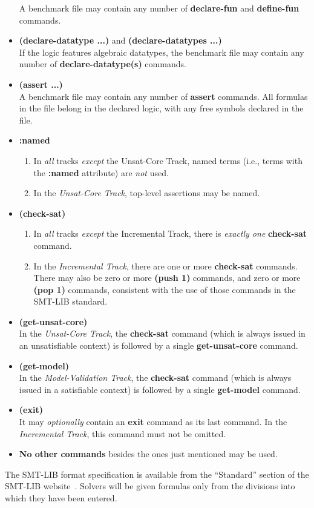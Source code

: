 \documentclass[12pt]{article}
\newcommand{\akey}[1]{\textbf{#1}\xspace}
\newcommand{\bkey}[1]{\textbf{{#1}}\xspace}
\newcommand{\inctrack}{Incremental Track\xspace}
\newcommand{\ucoretrack}{Unsat-Core Track\xspace}
\newcommand{\mvaltrack}{Model-Validation Track\xspace}
\begin{document}
\begin{itemize}
    A benchmark file may contain any number of \akey{declare-fun} and
    \akey{define-fun} commands.
  \item \bkey{(declare-datatype ...)} and \bkey{(declare-datatypes ...)}\\
    If the logic features algebraic datatypes, the benchmark file may
    contain any number of \akey{declare-datatype(s)} commands.
  \item \bkey{(assert ...)}\\
    A benchmark file may contain any number of \akey{assert} commands.  All
    formulas in the file belong in the declared logic, with any free symbols
    declared in the file.
  \item
    \bkey{:named}
    \begin{enumerate}[label=(\alph*)]
      \vspace{-1ex}
      \item In \emph{all} tracks \emph{except} the \ucoretrack,  named
        terms (i.e., terms with the \akey{:named} attribute) are \emph{not}
        used.
      \item In the \emph{\ucoretrack}, top-level assertions may be named.
    \end{enumerate}
    \item
      \bkey{(check-sat)}
      \begin{enumerate}[label=(\alph*)]
        \vspace{-1ex}
        \item In \emph{all} tracks \emph{except} the \inctrack, there is
          \emph{exactly one} \akey{check-sat} command.
        \item In the \emph{\inctrack}, there are one or more
        \akey{check-sat} commands.  There may also be zero or more
        \akey{(push 1)} commands, and zero or more \akey{(pop 1)} commands,
        consistent with the use of those commands in the SMT-LIB standard.
    \end{enumerate}
    \item \bkey{(get-unsat-core)}\\
      In the \emph{\ucoretrack}, the \akey{check-sat} command (which is
      always issued in an unsatisfiable context) is followed by a single
      \akey{get-unsat-core} command.
    \item \bkey{(get-model)}\\
      In the \emph{\mvaltrack}, the \akey{check-sat} command (which is
      always issued in a satisfiable context) is followed by a single
    \akey{get-model} command.
  \item \bkey{(exit)}\\
    It may \emph{optionally} contain an \akey{exit} command as its
    last command.  In the \emph{\inctrack}, this command must not be
    omitted.
  \item \textbf{No other commands} besides the ones just mentioned may be used.
\end{itemize}
%
The SMT-LIB format specification is available from the ``Standard''
section of the SMT-LIB website~\cite{SMT-LIB}.  Solvers will be given
formulas only from the divisions into which they have been entered.
\end{document}
